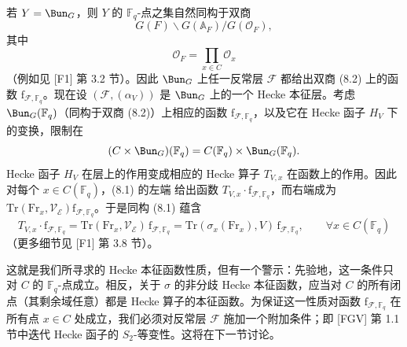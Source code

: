 若 $Y = \Bun_G$，则 $Y$ 的 $\mathbb{F}_q$-点之集自然同构于双商
\begin{equation}\tag{8.2}
G(F)\backslash G(\mathbb{A}_F)/G(\mathcal{O}_F),
\end{equation}
其中
\[
\mathcal{O}_F = \prod_{x\in C}\mathcal{O}_x
\]
（例如见 [F1] 第 3.2 节）。因此 $\Bun_G$ 上任一反常层 $\mathcal{F}$ 都给出双商 (8.2) 上的函数 $\mathrm{f}_{\mathcal{F},\mathbb{F}_q}$。现在设 $(\mathcal{F}, (\alpha_V))$ 是 $\Bun_G$ 上的一个 Hecke 本征层。考虑 $\Bun_G(\mathbb{F}_q)$（同构于双商 (8.2)）上相应的函数 $\mathrm{f}_{\mathcal{F},\mathbb{F}_q}$，以及它在 Hecke 函子 $H_V$ 下的变换，限制在
\[
(C \times \Bun_G)(\mathbb{F}_q) = C(\mathbb{F}_q)\times \Bun_G(\mathbb{F}_q).
\]
Hecke 函子 $H_V$ 在层上的作用变成相应的 Hecke 算子 $T_{V,x}$ 在函数上的作用。因此对每个 $x\in C(\mathbb{F}_q)$，(8.1) 的左端
给出函数 $T_{V,x}\cdot \mathrm{f}_{\mathcal{F},\mathbb{F}_q}$，而右端成为 $\mathrm{Tr}(\mathrm{Fr}_x, \mathcal{V}_{\mathcal{E}})\mathrm{f}_{\mathcal{F},\mathbb{F}_q}$。于是同构 (8.1) 蕴含
\begin{equation}\tag{8.3}
T_{V,x}\cdot \mathrm{f}_{\mathcal{F},\mathbb{F}_q} = \mathrm{Tr}(\mathrm{Fr}_x, \mathcal{V}_{\mathcal{E}})\,\mathrm{f}_{\mathcal{F},\mathbb{F}_q} = \mathrm{Tr}(\sigma_x(\mathrm{Fr}_x), V)\,\mathrm{f}_{\mathcal{F},\mathbb{F}_q}, \qquad \forall x\in C(\mathbb{F}_q)
\end{equation}
（更多细节见 [F1] 第 3.8 节）。


这就是我们所寻求的 Hecke 本征函数性质，但有一个警示：先验地，这一条件只对 $C$ 的 $\mathbb{F}_q$-点成立。相反，关于 $\sigma$ 的非分歧 Hecke 本征函数，应当对 $C$ 的所有闭点（其剩余域任意）都是 Hecke 算子的本征函数。为保证这一性质对函数 $\mathrm{f}_{\mathcal{F},\mathbb{F}_q}$ 在所有点 $x\in C$ 处成立，我们必须对反常层 $\mathcal{F}$ 施加一个附加条件；即 [FGV] 第 1.1 节中迭代 Hecke 函子的 $S_2$-等变性。这将在下一节讨论。

